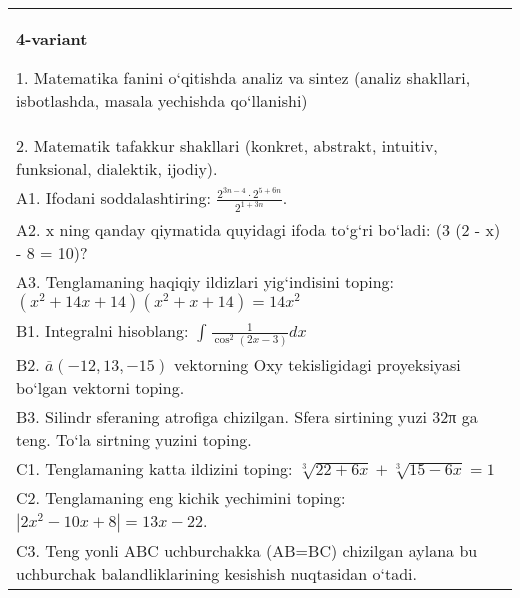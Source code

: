 \documentclass{article}
\begin{document}
\begin{tabular}{m{17cm}}
\textbf{4-variant}

1. Matematika fanini o‘qitishda analiz va sintez (analiz shakllari, isbotlashda, masala yechishda qo‘llanishi) \\
2. Matematik tafakkur shakllari (konkret, abstrakt, intuitiv, funksional, dialektik, ijodiy). \\
A1. Ifodani soddalashtiring: \(\frac{2^{3n - 4} \cdot 2^{5 + 6n}}{2^{1 + 3n}}\). \\
A2. x ning qanday qiymatida quyidagi ifoda to‘g‘ri bo‘ladi: (3 (2 - x) - 8 = 10)? \\
A3. Tenglamaning haqiqiy ildizlari yig‘indisini toping: \((x^2 + 14x + 14) (x^2 + x + 14) = 14x^2\) \\
B1. Integralni hisoblang: \(\int_{}^{}{\frac{1}{\cos^{2} (2x - 3) }dx}\) \\
B2. \(\overline{a} (- 12,13, - 15) \) vektorning Oxy tekisligidagi proyeksiyasi bo‘lgan vektorni toping. \\
B3. Silindr sferaning atrofiga chizilgan. Sfera sirtining yuzi 32π ga teng. To‘la sirtning yuzini toping. \\
C1. Tenglamaning katta ildizini toping: \(\sqrt[3]{22 + 6x} + \sqrt[3]{15 - 6x} = 1\) \\
C2. Tenglamaning eng kichik yechimini toping: \(\left| 2x^2 - 10x + 8 \right| = 13x - 22\). \\
C3. Teng yonli ABC uchburchakka (AB=BC) chizilgan aylana bu uchburchak balandliklarining kesishish nuqtasidan o‘tadi. \\

\end{tabular}
\vspace{1cm}
\end{document}
